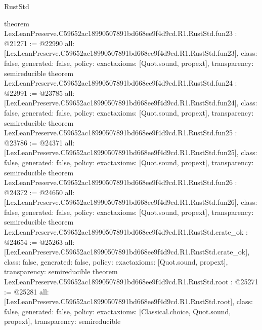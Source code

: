 \begin{lexlean}{RustStd}
\begin{coremodule}
{}
theorem LexLeanPreserve.C59652ac18990507891bd668ee9f4d9cd.R1.RustStd.fun23 : @21271 := @22990 {
  all: [LexLeanPreserve.C59652ac18990507891bd668ee9f4d9cd.R1.RustStd.fun23],
  class: false,
  generated: false,
  policy: exact{axioms: [Quot.sound, propext]},
  transparency: semireducible
}
theorem LexLeanPreserve.C59652ac18990507891bd668ee9f4d9cd.R1.RustStd.fun24 : @22991 := @23785 {
  all: [LexLeanPreserve.C59652ac18990507891bd668ee9f4d9cd.R1.RustStd.fun24],
  class: false,
  generated: false,
  policy: exact{axioms: [Quot.sound, propext]},
  transparency: semireducible
}
theorem LexLeanPreserve.C59652ac18990507891bd668ee9f4d9cd.R1.RustStd.fun25 : @23786 := @24371 {
  all: [LexLeanPreserve.C59652ac18990507891bd668ee9f4d9cd.R1.RustStd.fun25],
  class: false,
  generated: false,
  policy: exact{axioms: [Quot.sound, propext]},
  transparency: semireducible
}
theorem LexLeanPreserve.C59652ac18990507891bd668ee9f4d9cd.R1.RustStd.fun26 : @24372 := @24650 {
  all: [LexLeanPreserve.C59652ac18990507891bd668ee9f4d9cd.R1.RustStd.fun26],
  class: false,
  generated: false,
  policy: exact{axioms: [Quot.sound, propext]},
  transparency: semireducible
}
theorem LexLeanPreserve.C59652ac18990507891bd668ee9f4d9cd.R1.RustStd.crate_ok : @24654 := @25263 {
  all: [LexLeanPreserve.C59652ac18990507891bd668ee9f4d9cd.R1.RustStd.crate_ok],
  class: false,
  generated: false,
  policy: exact{axioms: [Quot.sound, propext]},
  transparency: semireducible
}
theorem LexLeanPreserve.C59652ac18990507891bd668ee9f4d9cd.R1.RustStd.root : @25271 := @25281 {
  all: [LexLeanPreserve.C59652ac18990507891bd668ee9f4d9cd.R1.RustStd.root],
  class: false,
  generated: false,
  policy: exact{axioms: [Classical.choice, Quot.sound, propext]},
  transparency: semireducible
}


\end{coremodule}
\end{lexlean}
